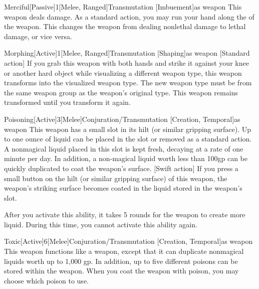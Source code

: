         \begin{magicitemdef}{Merciful}[Passive]{1}[Melee, Ranged]{Transmutation [Imbuement]}{as weapon}
             This weapon deals  damage.
            As a standard action, you may run your hand along the  of the weapon.
            This changes the weapon from dealing nonlethal damage to lethal damage, or vice versa.
        \end{magicitemdef}

        \begin{magicitemdef}{Morphing}[Active]{1}[Melee, Ranged]{Transmutation [Shaping]}{as weapon}
            [Standard action] If you grab this weapon with both hands and strike it against your knee or another hard object while visualizing a different weapon type, this weapon transforms into the visualized weapon type.
            The new weapon type must be from the same weapon group as the weapon's original type.
            This weapon remains transformed until you transform it again.
        \end{magicitemdef}

        \begin{magicitemdef}{Poisoning}[Active]{3}[Melee]{Conjuration/Transmutation [Creation, Temporal]}{as weapon}
             This weapon has a small slot in its hilt (or similar gripping surface). Up to one ounce of liquid can be placed in the slot or removed as a standard action. A nonmagical liquid placed in this slot is kept fresh, decaying at a rate of one minute per day. In addition, a non-magical liquid worth less than 100gp can be quickly duplicated to coat the weapon's surface.
            [Swift action] If you press a small button on the hilt (or similar gripping surface) of this weapon, the weapon's striking surface becomes coated in the liquid stored in the weapon's slot.

            After you activate this ability, it takes 5 rounds for the weapon to create more liquid.
            During this time, you cannot activate this ability again.
        \end{magicitemdef}

        \begin{magicitemdef}{Toxic}[Active]{6}[Melee]{Conjuration/Transmutation [Creation, Temporal]}{as weapon}
             This weapon functions like a  weapon, except that it can duplicate nonmagical liquids worth up to 1,000 gp.
            In addition, up to five different poisons can be stored within the weapon.
            When you coat the weapon with poison, you may choose which poison to use.
        \end{magicitemdef}

